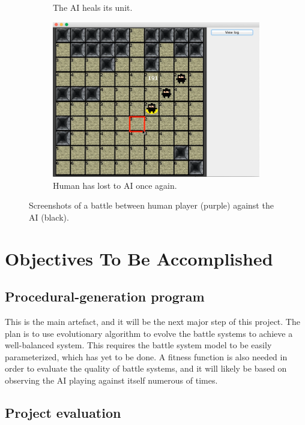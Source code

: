 \documentclass[a4paper,11pt]{article}
\begin{document}
\begin{figure}[H!]
\begin{subfigure}{.5\textwidth}
		\caption*{The AI heals its unit.}
	\end{subfigure}%
	\begin{subfigure}{.5\textwidth}
		\centering
		\includegraphics[width=.9\linewidth]{figures/battle3}
		\caption*{Human has lost to AI once again.}
	\end{subfigure}
	\caption{Screenshots of a battle between human player (purple) against the AI (black).}
	\label{ss}
\end{figure}

\section*{Objectives To Be Accomplished}

\subsection*{Procedural-generation program}

This is the main artefact, and it will be the next major step of this project. The plan is to use evolutionary algorithm to evolve the battle systems to achieve a well-balanced system. This requires the battle system model to be easily parameterized, which has yet to be done. A fitness function is also needed in order to evaluate the quality of battle systems, and it will likely be based on observing the AI playing against itself numerous of times.

\subsection*{Project evaluation}
\end{document}
